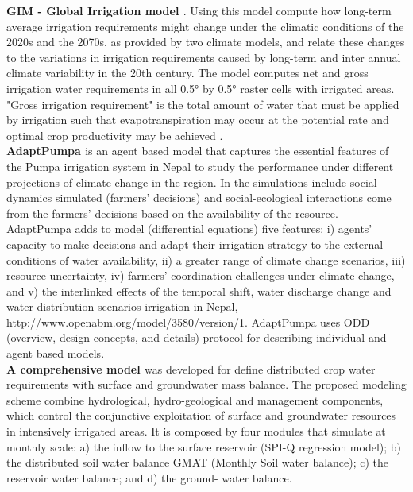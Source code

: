 \documentclass[letterpaper, 10 pt, conference]{ieeeconf}  %
\begin{document}
\textbf{GIM - Global Irrigation model \cite{doll2002global}}. Using this model compute how long-term average irrigation requirements might change under the climatic conditions of the 2020s and the 2070s, as provided by two climate models, and relate these changes to the variations in irrigation requirements caused by long-term and inter annual climate variability in the 20th century. The model computes net and gross irrigation water requirements in all 0.5° by 0.5° raster cells with irrigated areas. "Gross irrigation requirement" is the total amount of water that must be applied by irrigation such that evapotranspiration may occur at the potential rate and optimal crop productivity may be achieved \cite{doll2002impact}.\\

\textbf{AdaptPumpa \cite{Perez2016}} is an agent based model that captures the essential features of the Pumpa irrigation system in Nepal to study the performance  under different projections of climate change in the region. In the simulations include social dynamics simulated (farmers’ decisions) and social-ecological interactions come from the farmers’ decisions based on the availability of the resource. AdaptPumpa adds to \cite{cifdaloz2010robustness} model (differential equations) five features: i) agents’ capacity to make decisions and adapt their irrigation strategy to the external conditions of water availability, ii) a greater range of climate change scenarios, iii) resource uncertainty, iv) farmers’ coordination challenges under climate change, and v) the interlinked effects of the temporal shift, water discharge change and water distribution scenarios irrigation in Nepal, http://www.openabm.org/model/3580/version/1. AdaptPumpa uses ODD (overview, design concepts, and details) protocol  for describing individual and agent based models.\\ 

\textbf{A comprehensive model \cite{Guyennon2016}} was developed for define distributed crop water requirements with surface and groundwater mass balance. The proposed modeling scheme combine hydrological, hydro-geological and management components, which control the conjunctive exploitation of surface and groundwater resources in intensively irrigated areas. It is composed by four modules that simulate at monthly scale: a) the inflow to the surface reservoir (SPI-Q regression model); b) the distributed soil water balance GMAT (Monthly Soil water balance); c) the reservoir water balance; and d) the ground- water balance.\\
\end{document}
